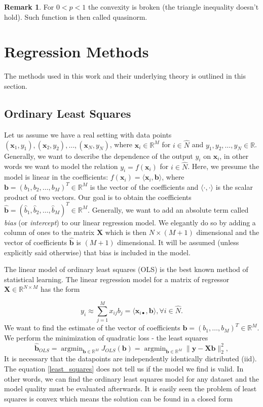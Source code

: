 \documentclass[11pt,american]{book} %
\theoremstyle{plain}
\theoremstyle{definition}
\newtheorem{rmrk}{Remark}
\DeclareMathOperator*{\argmin}{argmin} %
\begin{document}
\begin{rmrk}
	For $0<p<1$ the convexity is broken (the triangle inequality doesn't hold). Such function is then called quasinorm.
\end{rmrk}

\section{Regression Methods}
The methods used in this work and their underlying theory is outlined in this section.
\subsection{Ordinary Least Squares}
Let us assume we have a real setting with data points $(\bm{x}_1,y_1), (\bm{x}_2,y_2),\dots, (\bm{x}_N,y_N)$, where $\bm{x}_i \in \mathbb{R}^{M}$ for $i \in \hat{N}$ and $y_{1}, y_{2},\dots, y_{N} \in \mathbb{R}$. Generally, we want to describe the dependence of the output $y_{i}$ on $\bm{x}_{i}$, in other words we want to model the relation $y_{i}=f({\bm{x}}_{i})$ for $i \in \hat{N}$.
Here, we presume the model is linear in the coefficients: $f(\bm{x}_{i})= \langle\bm{x}_{i}, \bm{b}\rangle$, where $\bm{b}= (b_{1},b_{2},\dots,b_{M})^{T} \in \mathbb{R}^{M}$ is the vector of the coefficients and $\langle \cdot , \cdot \rangle$ is the scalar product of two vectors. Our goal is to obtain the coefficients $\bm{\hat{b}}= (\hat{b}_{1},\hat{b}_{2},\dots,\hat{b}_{M})^{T} \in \mathbb{R}^{M}$. Generally, we want to add an absolute term called \textit{bias} (or \textit{intercept}) to our linear regression model. We elegantly do so by adding a column of ones to the matrix  $\bm{X}$ which is then $N\times (M+1)$ dimensional and the vector of coefficients $\bm{\hat{b}}$ is $(M+1)$ dimensional. It will be assumed (unless explicitly said otherwise) that bias is included in the model.

The linear model of ordinary least squares (OLS) is the best known method of statistical learning. The linear regression model for a matrix of regressor $\bm{X} \in \mathbb{R}^{N \times M}$ has the form

\begin{equation}
	y_i \approx \sum_{j=1}^{M}x_{ij} b_j = \langle \bm{x}_{i \bullet}, \bm{b} \rangle , \forall i \in \hat{N}.
\end{equation}
We want to find the estimate of the vector of coefficients $\bm{b} = (b_1, \dots, b_M)^T \in \mathbb{R}^M$. We perform the minimization of quadratic loss - the least squares
\begin{equation}
	\bm{\hat{b}}_{OLS} =\argmin_{\bm{b} \in \mathbb{R}^{M}} J_{OLS}(\bm{b}) = \argmin_{\bm{b} \in \mathbb{R}^{M}} \lVert \bm{y}-\bm{X}\bm{b}\rVert_{2}^2, \label{least_squares}
\end{equation}
It is necessary that the datapoints are independently identically distributed (iid). The equation \ref{least_squares} does not tell us if the model we find is valid. In other words, we can find the ordinary least squares model for any dataset and the model quality must be evaluated afterwards. It is easily seen the problem of least squares is convex which means the solution can be found in a closed form
\end{document}

